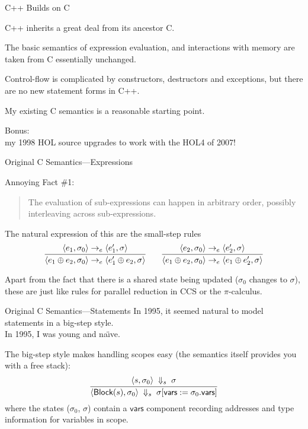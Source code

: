 \documentclass[compress,dvips,color=usenames,xcolor=dvipsnames]{beamer}
\newcommand{\cpp}{\mbox{C\hspace{-.1em}+\hspace{-.05em}+}}
\begin{document}
\begin{frame}{\cpp{} Builds on C}

\cpp{} inherits a great deal from its ancestor C.

\bigskip
The basic semantics of expression evaluation, and interactions with
memory are taken from C essentially unchanged.

\bigskip
Control-flow is complicated by constructors, destructors and
exceptions, but there are no new statement forms in \cpp.

\bigskip My existing C semantics is a reasonable starting point.

\bigskip \footnotesize
Bonus:\\
\quad my 1998 HOL source upgrades to work with the HOL4 of 2007!

\end{frame}

\begin{frame}{Original C Semantics---Expressions}

Annoying Fact \#1:
\begin{quote}
   The evaluation of sub-expressions can happen in arbitrary order,
   possibly interleaving across sub-expressions.
\end{quote}

\bigskip
The natural expression of this are the small-step rules
\[
\infer{
  \langle e_1 \oplus e_2, \sigma_0\rangle \rightarrow_e
  \langle e_1' \oplus e_2, \sigma\rangle
}{
  \langle e_1, \sigma_0\rangle \rightarrow_e \langle e_1',\sigma\rangle
} \qquad
\infer{
  \langle e_1 \oplus e_2, \sigma_0\rangle \rightarrow_e
  \langle e_1 \oplus e_2', \sigma\rangle
}{
  \langle e_2, \sigma_0\rangle \rightarrow_e \langle e_2',\sigma\rangle
}
\]

\bigskip Apart from the fact that there is a shared state being
updated ($\sigma_0$ changes to $\sigma$), these are just like rules
for parallel reduction in CCS or the $\pi$-calculus.
\end{frame}

\begin{frame}{Original C Semantics---Statements}
  In 1995, it seemed natural to model statements in a big-step
  style.\\
  In 1995, I was young and na\"\i{}ve.

\bigskip
The big-step style makes handling scopes easy (the semantics itself
provides you with a free stack):
\[
\infer{
  \langle \textsf{Block}(s), \sigma_0\rangle
  \;\Downarrow_s\;
  \sigma[\textsf{vars} := \sigma_0.\textsf{vars}]
}{
  \langle s, \sigma_0\rangle \;\Downarrow_s\; \sigma
}
\]
where the states ($\sigma_0$, $\sigma$) contain a $\textsf{vars}$
component recording addresses and type information for variables in
scope.

\end{frame}
\end{document}

